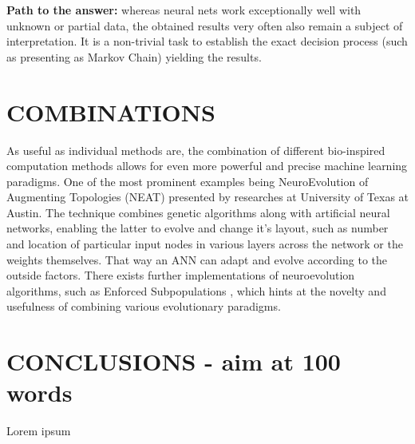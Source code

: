 \documentclass[letterpaper, 10 pt, conference]{ieeeconf}  %
\begin{document}
\textbf{Path to the answer:} whereas neural nets work exceptionally well with unknown or partial data, the obtained results very often also remain a subject of interpretation. It is a non-trivial task to establish the exact decision process (such as presenting as Markov Chain) yielding the results.

\section{COMBINATIONS}

As useful as individual methods are, the combination of different bio-inspired computation methods allows for even more powerful and precise machine learning paradigms. One of the most prominent examples being NeuroEvolution of Augmenting Topologies (NEAT) \cite{stanley2002evolving} presented by researches at University of Texas at Austin. The technique combines genetic algorithms along with artificial neural networks, enabling the latter to evolve and change it's layout, such as number and location of particular input nodes in various layers across the network or the weights themselves. That way an ANN can adapt and evolve according to the outside factors. There exists further implementations of neuroevolution algorithms, such as Enforced Subpopulations \cite{ha2015esp}, which hints at the novelty and usefulness of combining various evolutionary paradigms.

\section{CONCLUSIONS - aim at 100 words}

Lorem ipsum\cite{gunasekaran2011evaluation}

\addtolength{\textheight}{-12cm}   %










\end{document}
